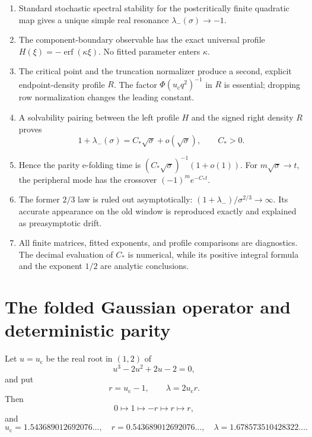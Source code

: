 \documentclass[11pt]{article}
\theoremstyle{definition}
\theoremstyle{remark}
\newcommand{\uc}{u_{\mathrm c}}
\newcommand{\erfop}{\operatorname{erf}}
\begin{document}
\begin{enumerate}[label=\textbf{R\arabic*.},leftmargin=3.2em]
 \item Standard stochastic spectral stability for the postcritically finite
 quadratic map gives a unique simple real resonance
 $\lambda_-(\sigma)\to-1$.

 \item The component-boundary observable has the exact universal profile
 $H(\xi)=-\erfop(\kappa\xi)$.  No fitted parameter enters $\kappa$.

 \item The critical point and the truncation normalizer produce a second,
 explicit endpoint-density profile $R$.  The factor
 $\Phi(u_{\mathrm c}q^2)^{-1}$ in $R$ is essential; dropping row
 normalization changes the leading constant.

 \item A solvability pairing between the left profile $H$ and the signed
 right density $R$ proves
 \[
  1+\lambda_-(\sigma)=C_*\sqrt\sigma+o(\sqrt\sigma),
  \qquad C_*>0.
 \]

 \item Hence the parity e-folding time is
 $(C_*\sqrt\sigma)^{-1}(1+o(1))$.  For
 $m\sqrt\sigma\to t$, the peripheral mode has the crossover
 $(-1)^m e^{-C_*t}$.

 \item The former $2/3$ law is ruled out asymptotically:
 $(1+\lambda_-)/\sigma^{2/3}\to\infty$.  Its accurate appearance on the old
 window is reproduced exactly and explained as preasymptotic drift.

 \item All finite matrices, fitted exponents, and profile comparisons are
 diagnostics.  The decimal evaluation of $C_*$ is numerical, while its
 positive integral formula and the exponent $1/2$ are analytic conclusions.
\end{enumerate}

\section{The folded Gaussian operator and deterministic parity}
\label{sec:operator}

Let $u=\uc$ be the real root in $(1,2)$ of
\begin{equation}\label{eq:cubic}
 u^3-2u^2+2u-2=0,
\end{equation}
and put
\begin{equation}\label{eq:constants}
 r=\uc-1,
 \qquad
 \lambda=2\uc r.
\end{equation}
Then
\begin{equation}\label{eq:critical-orbit}
 0\longmapsto1\longmapsto-r\longmapsto r\longmapsto r,
\end{equation}
and
\begin{equation}\label{eq:numerical-constants}
 \uc=1.543689012692076\ldots,
 \quad
 r=0.543689012692076\ldots,
 \quad
 \lambda=1.678573510428322\ldots.
\end{equation}
\end{document}
